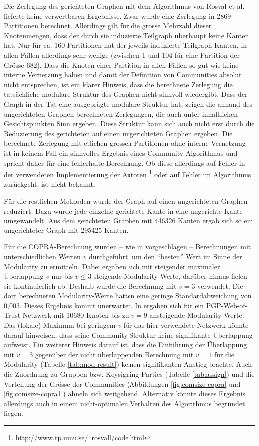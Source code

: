 Die Zerlegung des gerichteten Graphen mit dem Algorithmus von Rosval
et al. lieferte keine verwertbaren Ergebnisse. Zwar wurde eine
Zerlegung in 2869 Partitionen berechnet. Allerdings gilt f\"ur die
grosse Mehrzahl dieser Knotenmengen, dass der durch sie induzierte
Teilgraph \"uberhaupt keine Kanten hat. Nur f\"ur ca. 160 Partitionen
hat der jeweils induzierte Teilgraph Kanten, in allen F\"allen
allerdings sehr wenige (zwischen 1 und 104 f\"ur eine Partition der
Gr\"osse 682). Dass die Knoten einer Partition in allen F\"allen so
gut wie keine interne Vernetzung haben und damit der Definition von
Communities absolut nicht entsprechen, ist ein klarer Hinweis, dass
die berechnete Zerlegung die tats\"achliche modulare Struktur des
Graphen nicht sinnvoll wiedergibt. Dass der Graph in der Tat eine
ausgepr\"agte modulare Struktur hat, zeigen die anhand des
ungerichteten Graphen berechneten Zerlegungen, die auch unter
inhaltlichen Gesichtspunkten Sinn ergeben. Diese Struktur kann sich
auch nicht erst durch die Reduzierung des gerichteten auf einen
ungerichteten Graphen ergeben. Die berechnete Zerlegung mit etlichen
grossen Partitionen ohne interne Vernetzung ist in keinem Fall ein
sinnvolles Ergebnis eines Community-Algorithmus und spricht daher
f\"ur eine fehlerhafte Berechnung. Ob diese allerdings auf Fehler in
der verwendeten Implementierung der Autoren
\footnote{http://www.tp.umu.se/~rosvall/code.html} oder auf Fehler im
Algorithmus zur\"uckgeht, ist nicht bekannt.

F\"ur die restlichen Methoden wurde der Graph auf einen ungerichteten
Graphen reduziert. Dazu wurde jede einzelne gerichtete Kante in eine
ungerichte Kante umgewandelt. Aus dem gerichteten Graphen mit 446326
Kanten ergab sich so ein ungerichteter Graph mit 295425 Kanten.

F\"ur die COPRA-Berechnung wurden -- wie in \cite{Gregory2010}
vorgeschlagen -- Berechnungen mit unterschiedlichen Werten $v$
durchgef\"uhrt, um den ``besten'' Wert im Sinne der Modularity zu
ermitteln. Dabei ergaben sich mit steigender maximaler \"Uberlappung
$v$ nur bis $v\le 3$ steigende Modularity-Werte, dar\"uber hinaus
fielen sie kontinuierlich ab. Deshalb wurde die Berechnung mit $v=3$
verwendet. Die dort berechneten Modularity-Werte hatten eine geringe
Standardabweichung von 0,003. Dieses Ergebnis kommt unerwartet. In
\cite{Gregory2010} ergaben sich f\"ur ein PGP-Web-of-Trust-Netzwerk
mit 10680 Knoten bis zu $v=9$ ansteigende Modularity-Werte. Das
(lokale) Maximum bei geringem $v$ f\"ur das hier verwendete Netzwerk
k\"onnte darauf hinweisen, dass seine Community-Struktur keine
signifikante \"Uberlappung aufweist. Ein weiterer Hinweis darauf ist,
dass die Einf\"uhrung der \"Uberlappung mit $v=3$ gegen\"uber der
nicht \"uberlappenden Berechnung mit $v=1$ f\"ur die Modularity
(Tabelle \ref{tab:mod-result}) keinen signifikanten Anstieg
brachte. Auch die Zuordnung zu Gruppen bzw. Keysigning-Parties
(Tabelle \ref{tab:assign}) und die Verteilung der Gr\"osse der
Communities (Abbildungen \ref{fig:comsize-copra} und
\ref{fig:comsize-copra1}) \"ahneln sich weitgehend. Alternativ
k\"onnte dieses Ergebnis allerdings auch in einem nicht-optimalen
Verhalten des Algorithmus begr\"undet liegen.

